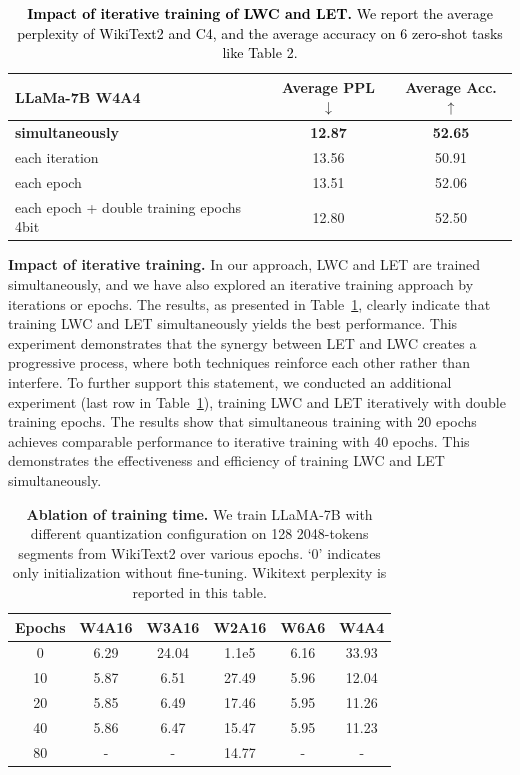 \documentclass{article} %
\begin{document}
\begin{table}[!ht]
    \centering
    \caption{\textcolor{black}{\textbf{Impact of iterative training of LWC and LET.} We report the average perplexity of WikiText2 and C4, and the average accuracy on 6 zero-shot tasks like Table 2.}}
    \color{black}
    \begin{tabular}{lcc}
    \hline
    \textbf{LLaMa-7B W4A4} & \textbf{Average PPL $\downarrow$} & \textbf{Average Acc. $\uparrow$} \\
    \hline
    \textbf{simultaneously} & \textbf{12.87} & \textbf{52.65} \\
    each iteration & 13.56 & 50.91 \\
    each epoch & 13.51 & 52.06 \\
    each epoch + double training epochs 4bit & 12.80 & 52.50 \\
    \hline
    \end{tabular}
    \label{tab:ablation_iteration}
\end{table}

\color{black}
\textbf{Impact of iterative training.} In our approach, LWC and LET are trained simultaneously, and we have also explored an iterative training approach by iterations or epochs. The results, as presented in Table~\ref{tab:ablation_iteration}, clearly indicate that training LWC and LET simultaneously yields the best performance. This experiment demonstrates that the synergy between LET and LWC creates a progressive process, where both techniques reinforce each other rather than interfere. To further support this statement, we conducted an additional experiment (last row in Table~\ref{tab:ablation_iteration}), training LWC and LET iteratively with double training epochs. The results show that simultaneous training with 20 epochs achieves comparable performance to iterative training with 40 epochs. This demonstrates the effectiveness and efficiency of training LWC and LET simultaneously.
\color{black}

\begin{table}[!ht]
    \centering
    \caption{\textbf{Ablation of training time.} We train LLaMA-7B with different quantization configuration on 128 2048-tokens segments from WikiText2 over various epochs. `0' indicates only initialization without fine-tuning. Wikitext perplexity is reported in this table.}
    \begin{tabular}{cccccc}
    \hline
    Epochs & W4A16 & W3A16 & W2A16 & W6A6 & W4A4 \\
    \hline
    0 & 6.29 & 24.04 & 1.1e5 & 6.16 & 33.93 \\
    10  & 5.87 & 6.51 & 27.49 & 5.96 & 12.04 \\
    20  & 5.85 & 6.49 & 17.46 & 5.95 & 11.26 \\
    40  & 5.86 & 6.47 & 15.47 & 5.95 & 11.23 \\
    80  & - & - & 14.77 & - & - \\
    \hline
    \end{tabular}
    \label{tab:ablation_time}
\end{table}
\end{document}
